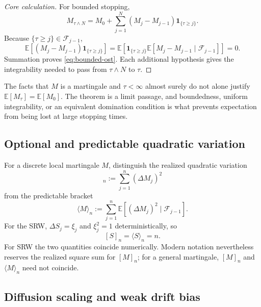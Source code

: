 \documentclass[10pt,a4paper]{article}
\numberwithin{equation}{section}
\theoremstyle{blueplain}
\theoremstyle{definition}
\newcommand{\E}{\mathbb E}
\newcommand{\F}{\mathcal F}
\newcommand{\ind}{\mathbf 1}
\begin{document}
\begin{proof}[Core calculation]
For bounded stopping,
\[
  M_{\tau\wedge N}
  =M_0+\sum_{j=1}^{N}
    (M_j-M_{j-1})\ind_{\{\tau\ge j\}}.
\]
Because \(\{\tau\ge j\}\in\F_{j-1}\),
\[
  \E\!\left[
    (M_j-M_{j-1})\ind_{\{\tau\ge j\}}
  \right]
  =
  \E\!\left[
    \ind_{\{\tau\ge j\}}
    \E[M_j-M_{j-1}\mid\F_{j-1}]
  \right]=0.
\]
Summation proves \eqref{eq:bounded-ost}.  Each additional hypothesis gives
the integrability needed to pass from \(\tau\wedge N\) to \(\tau\).
\end{proof}

\begin{keybox}
The facts that \(M\) is a martingale and \(\tau<\infty\) almost surely do not
alone justify \(\E[M_\tau]=\E[M_0]\).  The theorem is a limit passage, and
boundedness, uniform integrability, or an equivalent domination condition is
what prevents expectation from being lost at large stopping times.
\end{keybox}

\subsection{Optional and predictable quadratic variation}

For a discrete local martingale \(M\), distinguish the realized quadratic
variation
\begin{equation}
  [M]_n:=\sum_{j=1}^n(\Delta M_j)^2
  \label{eq:optional-qv}
\end{equation}
from the predictable bracket
\begin{equation}
  \langle M\rangle_n
  :=\sum_{j=1}^n\E[(\Delta M_j)^2\mid\F_{j-1}].
  \label{eq:predictable-qv}
\end{equation}
For the SRW, \(\Delta S_j=\xi_j\) and \(\xi_j^2=1\) deterministically, so
\begin{equation}
  \boxed{[S]_n=\langle S\rangle_n=n.}
  \label{eq:srw-qv}
\end{equation}
For SRW the two quantities coincide numerically.  Modern notation nevertheless
reserves the realized square sum for \([M]_n\); for a general martingale,
\([M]_n\) and \(\langle M\rangle_n\) need not coincide.

\subsection{Diffusion scaling and weak drift bias}
\end{document}
